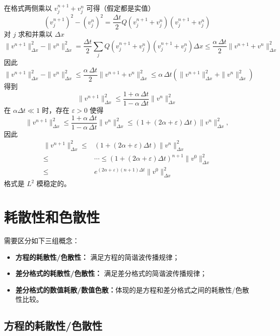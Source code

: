 \begin{solution*}
    在格式两侧乘以 $v_j^{n+1} + v_j^{n}$ 可得（假定都是实值）
    \[
        (v_j^{n+1})^2 - (v_j^{n})^2 = \frac{\Delta t}2 Q(v_j^{n+1} + v_j^n)(v_j^{n+1} + v_j^{n})
    \]
    对 $j$ 求和并乘以 $\Delta x$
    \[
        \|v^{n+1}\|_{\Delta x}^2 - \|v^{n}\|_{\Delta x}^2
        ={}
        \frac{\Delta t}{2} \sum_j Q(v_j^{n+1} + v_j^n)(v_j^{n+1} + v_j^{n}) \Delta x
        \le{}  \frac{\alpha \,\Delta t}{2} \|v^{n+1} + v^n\|_{\Delta x}^2
    \]
    因此
    \[
        \|v^{n+1}\|_{\Delta x}^2 - \|v^{n}\|_{\Delta x}^2 \le
        \frac{\alpha \,\Delta t}{2} \|v^{n+1} + v^n\|_{\Delta x}^2
        \le \alpha \,\Delta t \left(\|v^{n+1}\|_{\Delta x}^2 + \|v^{n}\|_{\Delta x}^2\right)
    \]
    得到
    \[
        \|v^{n+1}\|_{\Delta x}^2 \le \frac{1+ \alpha \,\Delta t}{1-\alpha \, \Delta t} \|v^{n}\|_{\Delta x}^2
    \]
    在 $\alpha \Delta t \ll 1$ 时，存在 $\varepsilon > 0$ 使得
    \[
        \|v^{n+1}\|_{\Delta x}^2 \le
        \frac{1+ \alpha \,\Delta t}{1-\alpha \, \Delta t} \|v^{n}\|_{\Delta x}^2
        \le (1 + (2\alpha +\varepsilon) \Delta t) \|v^{n}\|_{\Delta x}^2,
    \]
    因此
    \begin{align*}
        \|v^{n+1}\|_{\Delta x}^2 \le{} & (1 + (2\alpha+\varepsilon) \Delta t) \|v^{n}\|_{\Delta x}^2                  \\
        \le{}                          & \cdots \le (1 + (2\alpha+\varepsilon) \Delta t)^{n+1} \|v^{0}\|_{\Delta x}^2 \\
        \le{}                          & e^{(2\alpha+\varepsilon) (n+1)\Delta t} \|v^{0}\|_{\Delta x}^2
    \end{align*}
    格式是 $L^2$ 模稳定的。
\end{solution*}


\section{耗散性和色散性}

需要区分如下三组概念：
\begin{itemize}
    \item \textbf{方程的耗散性/色散性：} 满足方程的简谐波传播规律；
    \item \textbf{差分格式的耗散性/色散性：} 满足差分格式的简谐波传播规律；
    \item \textbf{差分格式的数值耗散/数值色散：}体现的是方程和差分格式之间的耗散性/色散性比较。
\end{itemize}

\subsection{方程的耗散性/色散性}

